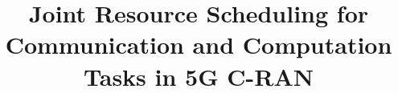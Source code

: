 \documentclass[journal, 12pt, onecolumn, draftclsnofoot]{IEEEtran}
\newcommand{\deny}[1]{}
\begin{document}
	
	\title{
		Joint Resource Scheduling for \deny{Heterogeneous} Communication and Computation Tasks in 5G C-RAN
	}
	\author{
    }%
	\maketitle

	
	
	

	
	
\end{document}

